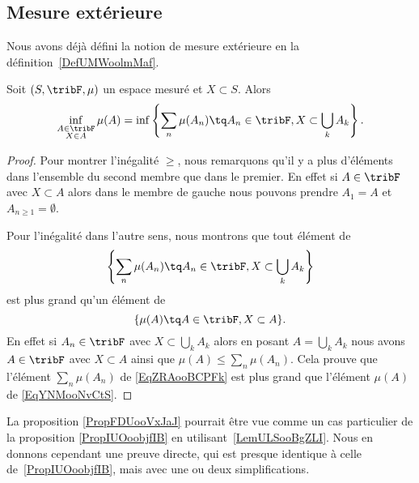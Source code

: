 \subsection{Mesure extérieure}

Nous avons déjà défini la notion de mesure extérieure en la définition~\ref{DefUMWoolmMaf}.

\begin{lemma}  \label{LemULSooBgZLI}
	Soit \( (S,\tribF,\mu)\) un espace mesuré et \( X\subset S\). Alors
	\begin{equation}
		\inf_{\substack{A\in\tribF\\X\in A}}\mu(A) = \inf\left\{ \sum_n\mu(A_n) \tq A_n\in\tribF,X\subset\bigcup_kA_k \right\}.
	\end{equation}
\end{lemma}

\begin{proof}
	Pour montrer l'inégalité \( \geq\), nous remarquons qu'il y a plus d'éléments dans l'ensemble du second membre que dans le premier. En effet si \( A\in\tribF\) avec \( X\subset A\) alors dans le membre de gauche nous pouvons prendre \( A_1=A\) et \( A_{n\geq 1}=\emptyset\).

	Pour l'inégalité dans l'autre sens, nous montrons que tout élément de
	\begin{equation}    \label{EqZRAooBCPFk}
		\left\{ \sum_n\mu(A_n) \tq A_n\in\tribF,X\subset\bigcup_kA_k \right\}
	\end{equation}
	est plus grand qu'un élément de
	\begin{equation}    \label{EqYNMooNvCtS}
		\{ \mu(A)\tq A\in\tribF,X\subset A \}.
	\end{equation}
	En effet si \( A_n\in\tribF\) avec \( X\subset \bigcup_kA_k\) alors en posant \( A=\bigcup_kA_k\) nous avons \( A\in\tribF\) avec \( X\subset A\) ainsi que \( \mu(A)\leq\sum_n\mu(A_n)\). Cela prouve que l'élément \( \sum_n\mu(A_n)\) de \eqref{EqZRAooBCPFk} est plus grand que l'élément \( \mu(A)\) de \eqref{EqYNMooNvCtS}.
\end{proof}

\begin{normaltext}
	La proposition \ref{PropFDUooVxJaJ} pourrait être vue comme un cas particulier de la proposition \ref{PropIUOoobjfIB} en utilisant~\ref{LemULSooBgZLI}. Nous en donnons cependant une preuve directe, qui est presque identique à celle de~\ref{PropIUOoobjfIB}, mais avec une ou deux simplifications.
\end{normaltext}

